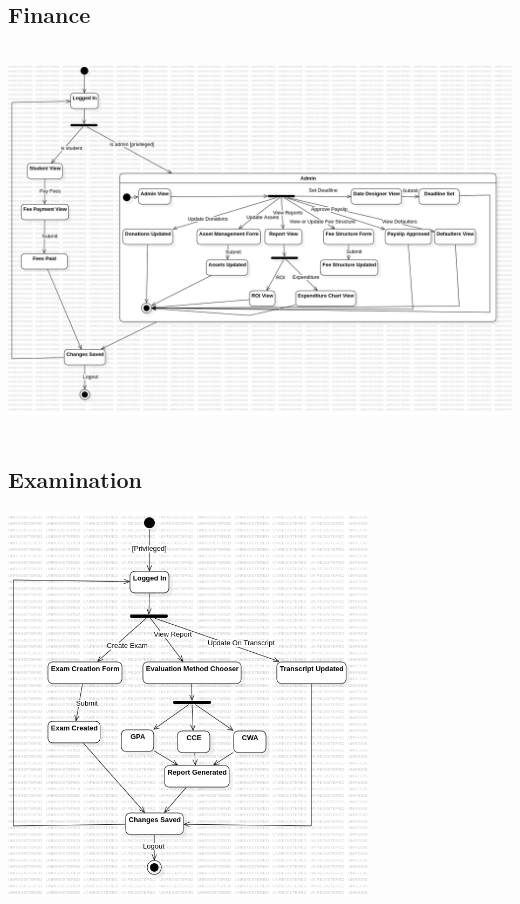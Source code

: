 \documentclass[11pt]{article}
\begin{document}
\subsection{Finance}
\begin{center}
\includegraphics[height=4in]{state_diagrams/StateMachine4!Finance_3.png}
\end{center}

\subsection{Examination}
\begin{center}
\includegraphics[height=4in]{state_diagrams/StateMachine5!Examination_4.png}
\end{center}
\end{document}
